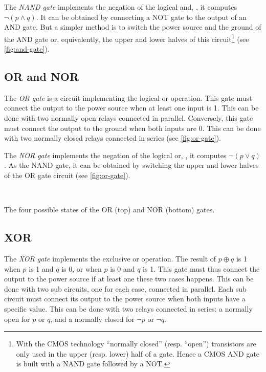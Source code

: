 The {\em NAND gate} implements the negation of the logical and, \ie, it
computes $\neg (p \wedge q)$. It can be obtained by connecting a NOT gate to
the output of an AND gate. But a simpler method is to switch the power source
and the ground of the AND gate or, equivalently, the upper and lower halves of
this circuit\footnote{With the CMOS technology ``normally closed'' (resp.
``open'') transistors are only used in the upper (resp. lower) half of a gate.
Hence a CMOS AND gate is built with a NAND gate followed by a NOT.} (see
\cref{fig:and-gate}).

\subsection{OR and NOR}

The {\em OR gate} is a circuit implementing the logical or operation. This
gate must connect the output to the power source when at least one input is
1. This can be done with two normally open relays connected in parallel.
Conversely, this gate must connect the output to the ground when both inputs
are 0. This can be done with two normally closed relays connected in series
(see \cref{fig:or-gate}).

The {\em NOR gate} implements the negation of the logical or, \ie, it computes
$\neg (p \vee q)$. As the NAND gate, it can be obtained by switching the upper
and lower halves of the OR gate circuit (see \cref{fig:or-gate}).

\begin{Figure}
   \\
  \medskip
  

  \caption{The four possible states of the OR (top) and NOR (bottom)
  gates.}\label{fig:or-gate}
\end{Figure}

\subsection{XOR}

The {\em XOR gate} implements the exclusive or operation. The result of $p
\oplus q$ is 1 when $p$ is 1 and $q$ is 0, or when $p$ is 0 and $q$ is 1. This
gate must thus connect the output to the power source if at least one these two
cases happens. This can be done with two sub circuits, one for each case,
connected in parallel. Each sub circuit must connect its output to the power
source when both inputs have a specific value. This can be done with two relays
connected in series: a normally open for $p$ or $q$, and a normally closed for
$\neg p$ or $\neg q$.

